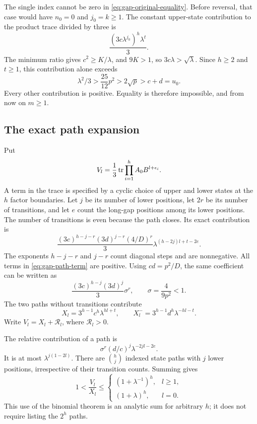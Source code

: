 The single index cannot be zero in \eqref{eq:gap-original-equality}.
Before reversal, that case would have $n_0=0$ and $j_0=k\geqslant1$.
The constant upper-state contribution to the product trace divided by
three is
$$
 \frac{(3c\lambda^{j_0})^h\lambda^t}{3}.
$$
The minimum ratio gives $c^2\geqslant K/\lambda$, and $9K>1$, so
$3c\lambda>\sqrt\lambda$. Since $h\geqslant2$ and $t\geqslant1$,
this contribution alone exceeds
$$
 \lambda^2/3>\frac{25}{12}p^2>2\sqrt p>c+d=u_0.
$$
Every other contribution is positive. Equality is therefore impossible,
and from now on $m\geqslant1$.

\subsection{The exact path expansion}

Put
\begin{equation}\label{eq:gap-word-trace}
 V_l=\frac13\operatorname{tr}\prod_{i=1}^h A_0B^{l+\epsilon_i}.
\end{equation}
A term in the trace is specified by a cyclic choice of upper and lower
states at the $h$ factor boundaries. Let $j$ be its number of lower
positions, let $2r$ be its number of transitions, and let $e$ count the
long-gap positions among its lower positions. The number of transitions
is even because the path closes. Its exact contribution is
\begin{equation}\label{eq:gap-path-term}
 \frac{(3c)^{h-j-r}(3d)^{j-r}(4/D)^r}{3}
 \lambda^{(h-2j)l+t-2e}.
\end{equation}
The exponents $h-j-r$ and $j-r$ count diagonal steps and are
nonnegative. All terms in \eqref{eq:gap-path-term} are positive.
Using $cd=p^2/D$, the same coefficient can be written as
\begin{equation}\label{eq:gap-transition-factor}
 \frac{(3c)^{h-j}(3d)^j}{3}\sigma^r,
 \qquad \sigma=\frac4{9p^2}<1.
\end{equation}
The two paths without transitions contribute
\begin{equation}\label{eq:gap-constant-paths}
 X_l=3^{h-1}c^h\lambda^{hl+t},\qquad
 X_l^-=3^{h-1}d^h\lambda^{-hl-t}.
\end{equation}
Write $V_l=X_l+\mathcal R_l$, where $\mathcal R_l>0$.

The relative contribution of a path is
\begin{equation}\label{eq:gap-relative-path}
 \sigma^r(d/c)^j\lambda^{-2jl-2e}.
\end{equation}
It is at most $\lambda^{j(1-2l)}$. There are $\binom hj$ indexed
state paths with $j$ lower positions, irrespective of their transition
counts. Summing gives
\begin{equation}\label{eq:gap-binomial-bound}
 1<\frac{V_l}{X_l}\leqslant
 \begin{cases}
 (1+\lambda^{-1})^h,&l\geqslant1,\\
 (1+\lambda)^h,&l=0.
 \end{cases}
\end{equation}
This use of the binomial theorem is an analytic sum for arbitrary $h$;
it does not require listing the $2^h$ paths.

